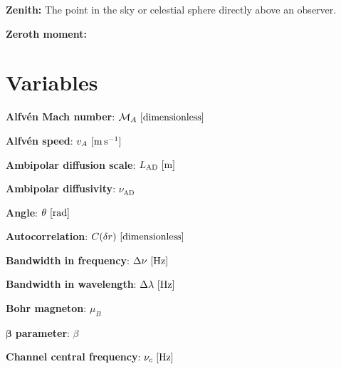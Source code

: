 \documentclass[a4paper,10pt]{article}
\begin{document}
{\noindent}\textbf{Zenith:} The point in the sky or celestial sphere directly above an observer.

{\noindent}\textbf{Zeroth moment:} 









































\newpage
\section{Variables}

{\noindent}\textbf{Alfv\'en Mach number}: $\mathcal{M}_A~[{\rm dimensionless}]$

{\noindent}\textbf{Alfv\'en speed}: $v_A~[{\rm m\,s^{-1}}]$

{\noindent}\textbf{Ambipolar diffusion scale}: $L_\mathrm{AD}~[{\rm m}]$

{\noindent}\textbf{Ambipolar diffusivity}: $\nu_\mathrm{AD}$

{\noindent}\textbf{Angle}: $\theta~[{\rm rad}]$

{\noindent}\textbf{Autocorrelation}: $C(\delta r)~[{\rm dimensionless}]$

{\noindent}\textbf{Bandwidth in frequency}: $\Delta\nu~[{\rm Hz}]$

{\noindent}\textbf{Bandwidth in wavelength}: $\Delta\lambda~[{\rm Hz}]$

{\noindent}\textbf{Bohr magneton}: $\mu_B$

{\noindent}$\boldsymbol{\beta}$ \textbf{parameter}: $\beta$

{\noindent}\textbf{Channel central frequency}: $\nu_c~[{\rm Hz}]$
\end{document}
